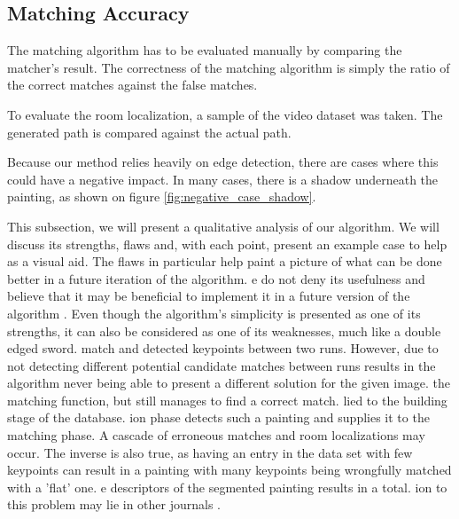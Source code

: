 \subsection{Matching Accuracy}
The matching algorithm has to be evaluated manually by comparing the matcher's result. The correctness of the matching algorithm is simply the ratio of the correct matches against the false matches.

To evaluate the room localization, a sample of the video dataset was taken. The generated path is compared against the actual path.


	
	
	
	Because our method relies heavily on edge detection, there are cases where this could have a negative impact. In many cases, there is a shadow underneath the painting, as shown on figure \ref{fig:negative_case_shadow}.
	


This subsection, we will present a qualitative analysis of our algorithm. We will discuss its strengths, flaws and, with each point, present an example case to help as a visual aid. The flaws in particular help paint a picture of what can be done better in a future iteration of the algorithm. 
e do not deny its usefulness and believe that it may be beneficial to implement it in a future version of the algorithm . Even though the algorithm's simplicity is presented as one of its strengths, it can also be considered as one of its weaknesses, much like a double edged sword.
match and detected keypoints between two runs. However, due to not detecting different potential candidate matches between runs results in the algorithm never being able to present a different solution for the given image.
 the matching function, but still manages to find a correct match.
lied to the building stage of the database.
ion phase detects such a painting and supplies it to the matching phase. A cascade of erroneous matches and room localizations may occur. The inverse is also true, as having an entry in the data set with few keypoints can result in a painting with many keypoints being wrongfully matched with a 'flat' one.
e descriptors of the segmented painting results in a total.
ion to this problem may lie in other journals . 